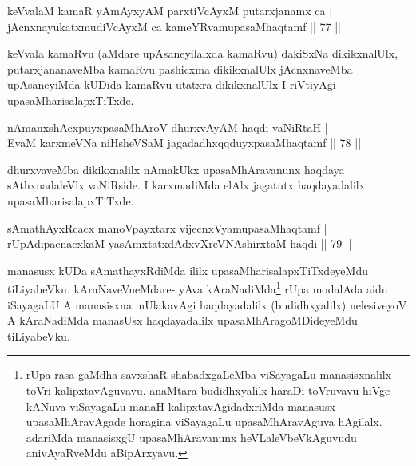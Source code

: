 
\begin{shl}
keVvalaM kamaR yAmAyxyAM parxtiVcAyxM putarxjanamx ca |\\
jAcnxnayukatxmudiVcAyxM ca kameYRvamupasaMhaqtamf \hfill || 77 ||
\end{shl}

\begin{artha}
keVvala kamaRvu (aMdare upAsaneyilalxda kamaRvu) dakiSxNa dikikxnalUlx, putarxjananaveMba kamaRvu pashicxma dikikxnalUlx jAcnxnaveMba upAsaneyiMda kUDida kamaRvu utatxra dikikxnalUlx I riVtiyAgi upasaMharisalapxTiTxde.
\end{artha}

\begin{shl}
nAmanxshAcxpuyxpasaMhAroV \footnotemark[1]{}dhurxvAyAM haqdi vaNiRtaH |\\
EvaM karxmeVNa niHsheVSaM jagadadhxqqduyxpasaMhaqtamf \hfill || 78 ||
\end{shl}

\begin{artha}
dhurxvaveMba dikikxnalilx nAmakUkx upasaMhAravanunx haqdaya sAthxnadaleVlx vaNiRside. I karxmadiMda elAlx jagatutx haqdayadalilx upasaMharisalapxTiTxde.
\end{artha}


\begin{shl}
sAmathAyxRcacx manoV\s payxtarx vijecnxVyamupasaMhaqtamf |\\
rUpAdipacnacxkaM yasAmxtatxdAdxvXreVNA\s \s shirxtaM haqdi \hfill || 79 ||
\end{shl}

\begin{artha}
manasusx kUDa sAmathayxRdiMda ililx upasaMharisalapxTiTxdeyeMdu tiLiyabeVku. kAraNaveVneMdare- yAva kAraNadiMda\footnote[2]{rUpa rasa gaMdha savxshaR shabadxgaLeMba viSayagaLu manasisxnalilx toVri kalipxtavAguvavu. anaMtara budidhxyalilx haraDi toVruvavu hiVge kANuva viSayagaLu manaH kalipxtavAgidadxriMda manasusx upasaMhAravAgade horagina viSayagaLu upasaMhAravAguva hAgilalx. adariMda manasisxgU upasaMhAravanunx heVLaleVbeVkAguvudu anivAyaRveMdu aBipArxyavu.} rUpa modalAda aidu iSayagaLU A manasisxna mUlakavAgi haqdayadalilx (budidhxyalilx) nelesiveyoV A kAraNadiMda manasUsx haqdayadalilx upasaMhAragoMDideyeMdu tiLiyabeVku.
\end{artha}%

